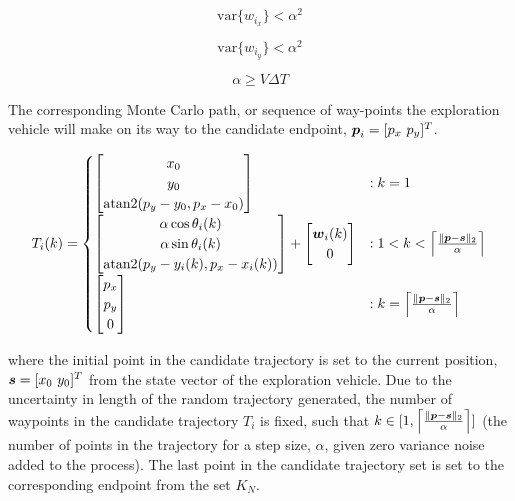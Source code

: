 \begin{equation}
\text{var}\{w_{i_x}\} < \alpha^2
\end{equation}

\begin{equation}
\text{var}\{w_{i_y}\} < \alpha^2
\end{equation}

\begin{equation}
\alpha \geq V \Delta T
\end{equation}

The corresponding Monte Carlo path, or sequence of way-points the exploration vehicle will make on its way to the candidate endpoint, ${\it{\boldsymbol{p}}}_i = [p_x\ p_y]^T$.

\begin{equation}
\label{eq:mcpp}
T_{i}(k) = \begin{cases}
	\begin{bmatrix}
		x_0 \\
		y_0\\
		\text{atan2}(p_y - y_0, p_x - x_0)
	\end{bmatrix} & : k = 1 \\

	\begin{bmatrix}
		\alpha \cos \theta_i(k) \\
		\alpha \sin \theta_i(k) \\
		\text{atan2}(p_y - y_i(k), p_x - x_i(k))
	\end{bmatrix} + \begin{bmatrix} 
		{\it{\boldsymbol{w}}}_i(k) \\
		0
	\end{bmatrix} & : 1 < k < \Big\lceil \frac{\|{\it{\boldsymbol{p}}} - {\it{\boldsymbol{s}}}\|_2}{\alpha} \Big\rceil \\


	\begin{bmatrix} p_x \\ p_y \\ 0\end{bmatrix} & : k = \Big\lceil \frac{\|{\it{\boldsymbol{p}}} - {\it{\boldsymbol{s}}}\|_2}{\alpha} \Big\rceil \\

\end{cases}
\end{equation}

\noindent where the initial point in the candidate trajectory is set to the current position, $\vect{s}=[x_0\ y_0]^T$ from the state vector of the exploration vehicle. Due to the uncertainty in length of the random trajectory generated, the number of waypoints in the candidate trajectory $T_i$ is fixed, such that $k \in [1, \Big\lceil \frac{\|{\it{\boldsymbol{p}}}- {\it{\boldsymbol{s}}}\|_2}{\alpha} \Big\rceil]$ (the number of points in the trajectory for a step size, $\alpha$, given zero variance noise added to the process). The last point in the candidate trajectory set is set to the corresponding endpoint from the set $K_N$.

